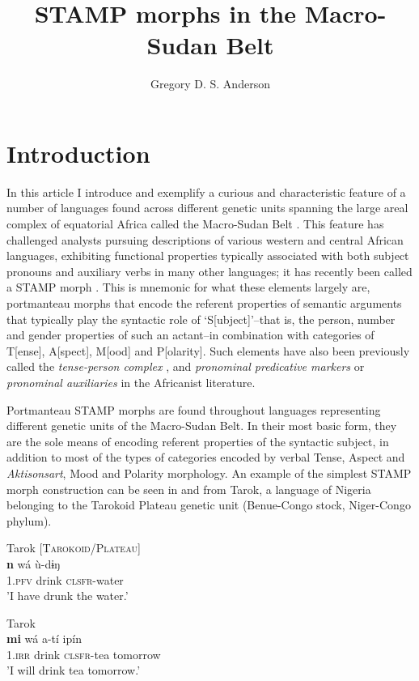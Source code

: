 \documentclass[output=paper]{langsci/langscibook}
\title{STAMP morphs in the Macro-Sudan Belt}
\author{%
Gregory D. S. Anderson
\affiliation{Living Tongues Institute for Endangered Languages \& University of South Africa (UNISA)} 
}
\begin{document}
\section{Introduction}\label{sec:Anderson:1}

In this article I introduce and exemplify a curious and characteristic feature of a number of languages found across different genetic units spanning the large areal complex of equatorial Africa called the Macro-Sudan Belt \citep{Güldemann2008}. This feature has challenged analysts pursuing descriptions of various western and central African languages, exhibiting functional properties typically associated with both subject pronouns and auxiliary verbs in many other languages; it has recently been called a STAMP morph \citep{Anderson2012, Anderson2015}. This is mnemonic for what these elements largely are, portmanteau morphs that encode the referent properties of semantic arguments that typically play the syntactic role of `S[ubject]'–that is, the person, number and gender properties of such an actant–in combination with categories of T[ense], A[spect], M[ood] and P[olarity]. Such elements have also been previously called the \textit{tense-person complex} \citep{Creissels2005}, and \textit{pronominal predicative markers} or \textit{pronominal auxiliaries} \citep{Vydrine2011,Erman2002} in the Africanist literature. 

  Portmanteau STAMP morphs are found throughout languages representing different genetic units of the Macro-Sudan Belt. In their most basic form, they are the sole means of encoding referent properties of the syntactic subject, in addition to most of the types of categories encoded by verbal Tense, Aspect and \textit{Aktisonsart}, Mood and Polarity morphology. An example of the simplest STAMP morph construction can be seen in  and  from Tarok, a language of Nigeria belonging to the Tarokoid Plateau genetic unit (Benue-Congo stock, Niger-Congo phylum).
  
\ea\label{ex:anderson:1}
Tarok \citep[238]{Sibomana1981}        [\textsc{Tarokoid/Plateau}]\\
\gll \textbf{n}        wá     ù-dɨŋ    \\
\textsc{1.pfv}  drink \textsc{clsfr}-water\\
\glt 'I have drunk the water.'      
\z

\ea\label{ex:anderson:2}
Tarok   \\
\gll \textbf{mi}    wá  a-tí      ipín  \\
1\textsc{.irr}  drink  \textsc{clsfr}-tea tomorrow \\
\glt 'I will drink tea tomorrow.'
\z
\end{document}
